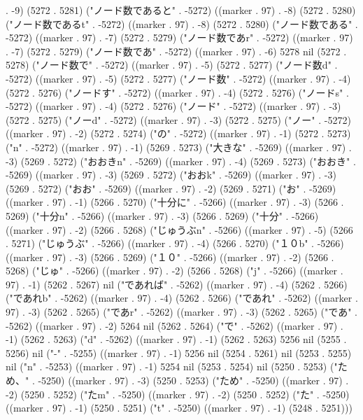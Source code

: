 . -9) (5272 . 5281) ("ノード数であると" . -5272) ((marker . 97) . -8) (5272 . 5280) ("ノード数であるt" . -5272) ((marker . 97) . -8) (5272 . 5280) ("ノード数である" . -5272) ((marker . 97) . -7) (5272 . 5279) ("ノード数であr" . -5272) ((marker . 97) . -7) (5272 . 5279) ("ノード数であ" . -5272) ((marker . 97) . -6) 5278 nil (5272 . 5278) ("ノード数で" . -5272) ((marker . 97) . -5) (5272 . 5277) ("ノード数d" . -5272) ((marker . 97) . -5) (5272 . 5277) ("ノード数" . -5272) ((marker . 97) . -4) (5272 . 5276) ("ノードす" . -5272) ((marker . 97) . -4) (5272 . 5276) ("ノードs" . -5272) ((marker . 97) . -4) (5272 . 5276) ("ノード" . -5272) ((marker . 97) . -3) (5272 . 5275) ("ノーd" . -5272) ((marker . 97) . -3) (5272 . 5275) ("ノー" . -5272) ((marker . 97) . -2) (5272 . 5274) ("の" . -5272) ((marker . 97) . -1) (5272 . 5273) ("n" . -5272) ((marker . 97) . -1) (5269 . 5273) ("大きな" . -5269) ((marker . 97) . -3) (5269 . 5272) ("おおきn" . -5269) ((marker . 97) . -4) (5269 . 5273) ("おおき" . -5269) ((marker . 97) . -3) (5269 . 5272) ("おおk" . -5269) ((marker . 97) . -3) (5269 . 5272) ("おお" . -5269) ((marker . 97) . -2) (5269 . 5271) ("お" . -5269) ((marker . 97) . -1) (5266 . 5270) ("十分に" . -5266) ((marker . 97) . -3) (5266 . 5269) ("十分n" . -5266) ((marker . 97) . -3) (5266 . 5269) ("十分" . -5266) ((marker . 97) . -2) (5266 . 5268) ("じゅうぶn" . -5266) ((marker . 97) . -5) (5266 . 5271) ("じゅうぶ" . -5266) ((marker . 97) . -4) (5266 . 5270) ("１０b" . -5266) ((marker . 97) . -3) (5266 . 5269) ("１０" . -5266) ((marker . 97) . -2) (5266 . 5268) ("じゅ" . -5266) ((marker . 97) . -2) (5266 . 5268) ("j" . -5266) ((marker . 97) . -1) (5262 . 5267) nil ("であれば" . -5262) ((marker . 97) . -4) (5262 . 5266) ("であれb" . -5262) ((marker . 97) . -4) (5262 . 5266) ("であれ" . -5262) ((marker . 97) . -3) (5262 . 5265) ("であr" . -5262) ((marker . 97) . -3) (5262 . 5265) ("であ" . -5262) ((marker . 97) . -2) 5264 nil (5262 . 5264) ("で" . -5262) ((marker . 97) . -1) (5262 . 5263) ("d" . -5262) ((marker . 97) . -1) (5262 . 5263) 5256 nil (5255 . 5256) nil ("-" . -5255) ((marker . 97) . -1) 5256 nil (5254 . 5261) nil (5253 . 5255) nil ("n" . -5253) ((marker . 97) . -1) 5254 nil (5253 . 5254) nil (5250 . 5253) ("ため、" . -5250) ((marker . 97) . -3) (5250 . 5253) ("ため" . -5250) ((marker . 97) . -2) (5250 . 5252) ("たm" . -5250) ((marker . 97) . -2) (5250 . 5252) ("た" . -5250) ((marker . 97) . -1) (5250 . 5251) ("t" . -5250) ((marker . 97) . -1) (5248 . 5251)))
